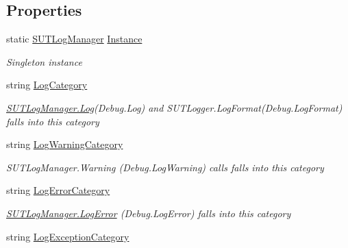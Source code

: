 \subsection*{Properties}
\begin{DoxyCompactItemize}
\item 
static \mbox{\hyperlink{class_s_u_t_log_manager}{S\+U\+T\+Log\+Manager}} \mbox{\hyperlink{class_s_u_t_log_manager_a7f02a96e962deb687b63b19b5ab33e13}{Instance}}
\begin{DoxyCompactList}\small\item\em Singleton instance \end{DoxyCompactList}\item 
string \mbox{\hyperlink{class_s_u_t_log_manager_ae14c42442f80f83008ffd0698d3b1093}{Log\+Category}}
\begin{DoxyCompactList}\small\item\em \mbox{\hyperlink{class_s_u_t_log_manager_a93ab3606fa0ca251e796f9383537c7ca}{S\+U\+T\+Log\+Manager.\+Log}}(Debug.\+Log) and S\+U\+T\+Logger.\+Log\+Format(Debug.\+Log\+Format) falls into this category \end{DoxyCompactList}\item 
string \mbox{\hyperlink{class_s_u_t_log_manager_a112da3e3ed2a3044086b831629bbf192}{Log\+Warning\+Category}}
\begin{DoxyCompactList}\small\item\em S\+U\+T\+Log\+Manager.\+Warning (Debug.\+Log\+Warning) calls falls into this category \end{DoxyCompactList}\item 
string \mbox{\hyperlink{class_s_u_t_log_manager_acaa741c700b30172f48dd0bc1e20b79d}{Log\+Error\+Category}}
\begin{DoxyCompactList}\small\item\em \mbox{\hyperlink{class_s_u_t_log_manager_a26f1bf1459d00460dea0f3eda900ef5a}{S\+U\+T\+Log\+Manager.\+Log\+Error}} (Debug.\+Log\+Error) falls into this category \end{DoxyCompactList}\item 
string \mbox{\hyperlink{class_s_u_t_log_manager_ab978587299dd80997fb28e7bd28f8272}{Log\+Exception\+Category}}

\end{DoxyCompactItemize}
